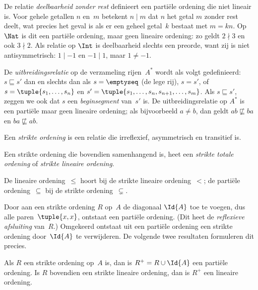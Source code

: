 \documentclass[../../../include/open-logic-section]{subfiles}
\begin{document}
\begin{ex}
De relatie \emph{deelbaarheid zonder rest} definieert een partiële ordening die
niet lineair is. Voor gehele getallen $n$ en~$m$ betekent $n \mid m$ dat $n$
het getal $m$ zonder rest deelt, wat precies het geval is als er een geheel
getal~$k$ bestaat met $m = kn$. Op~$\Nat$ is dit een partiële
ordening, maar geen lineaire ordening: zo geldt $2 \nmid 3$ en ook $3 \nmid
2$. Als relatie op $\Int$ is deelbaarheid slechts een preorde, want zij is niet
antisymmetrisch: $1 \mid -1$ en $-1 \mid 1$, maar $1 \neq -1$.
\end{ex}

\begin{ex}
De \emph{uitbreidingsrelatie} op de verzameling rijen~$A^*$ wordt als volgt
gedefinieerd: $s \sqsubseteq s'$ dan en slechts dan als $s = \emptyseq$ (de lege
rij), $s = s'$, of $s = \tuple{s_1, \dots, s_n}$ en $s' =
\tuple{s_1, \dots, s_n, s_{n+1}, \dots, s_m}$. Als $s \sqsubseteq s'$,
zeggen we ook dat $s$ een \emph{beginsegment} van~$s'$ is. De
uitbreidingsrelatie op $A^*$ is een partiële maar geen lineaire ordening; als
bijvoorbeeld $a \neq b$, dan geldt $ab \not\sqsubseteq ba$ en $ba \not\sqsubseteq ab$.
\end{ex}

\begin{defn}
Een \emph{strikte ordening} is een relatie die irreflexief, asymmetrisch en
transitief is.
\end{defn}

\begin{defn}
Een strikte ordening die bovendien samenhangend is, heet een
\emph{strikte totale ordening} of \emph{strikte lineaire ordening}.
\end{defn}

\begin{ex}
De lineaire ordening~$\le$ hoort bij de strikte lineaire ordening~$<$; de
partiële ordening~$\subseteq$ bij de strikte ordening~$\subsetneq$.
\end{ex}

Door aan een strikte ordening $R$ op~$A$ de diagonaal $\Id{A}$ toe te voegen,
dus alle paren~$\tuple{x, x}$, ontstaat een partiële ordening.  (Dit heet de
\emph{reflexieve afsluiting} van~$R$.) Omgekeerd ontstaat uit een partiële
ordening een strikte ordening door~$\Id{A}$ te verwijderen. De volgende twee
resultaten formuleren dit precies.

\begin{prop}
Als $R$ een strikte ordening op~$A$ is, dan is $R^+ = R \cup \Id{A}$ een
partiële ordening. Is $R$ bovendien een strikte lineaire ordening, dan is
$R^+$ een lineaire ordening.
\end{prop}
\end{document}
